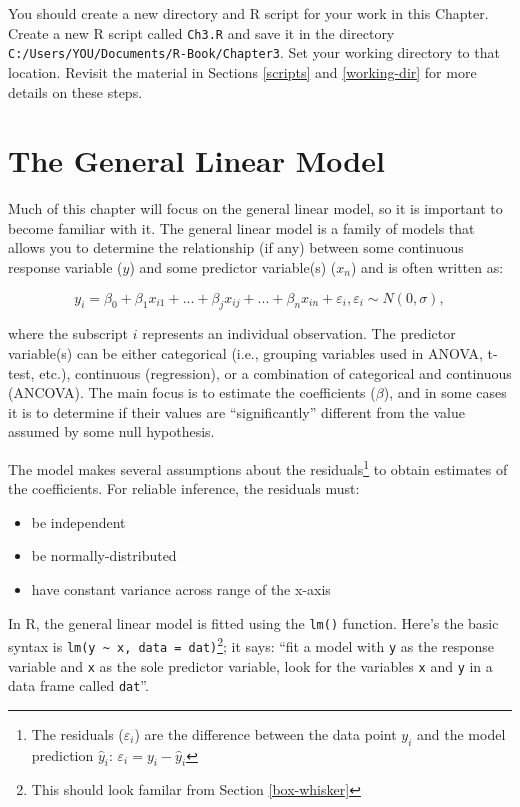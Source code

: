 \documentclass[]{book}
\providecommand{\tightlist}{%
  \setlength{\itemsep}{0pt}\setlength{\parskip}{0pt}}
\let\rmarkdownfootnote\footnote%
\def\footnote{\protect\rmarkdownfootnote}
\theoremstyle{definition}
\theoremstyle{definition}
\theoremstyle{definition}
\theoremstyle{remark}
\begin{document}
You should create a new directory and R script for your work in this
Chapter. Create a new R script called \texttt{Ch3.R} and save it in the
directory \texttt{C:/Users/YOU/Documents/R-Book/Chapter3}. Set your
working directory to that location. Revisit the material in Sections
\ref{scripts} and \ref{working-dir} for more details on these steps.

\section{The General Linear Model}\label{lm}

Much of this chapter will focus on the general linear model, so it is
important to become familiar with it. The general linear model is a
family of models that allows you to determine the relationship (if any)
between some continuous response variable (\(y\)) and some predictor
variable(s) (\(x_n\)) and is often written as:

\begin{equation}
  y_i=\beta_0 + \beta_1 x_{i1} + ... + \beta_j x_{ij}+ ... + \beta_n x_{in} + \varepsilon_i, \varepsilon_i \sim N(0,\sigma),
\label{eq:lin-mod}
\end{equation}

where the subscript \(i\) represents an individual observation. The
predictor variable(s) can be either categorical (i.e., grouping
variables used in ANOVA, t-test, etc.), continuous (regression), or a
combination of categorical and continuous (ANCOVA). The main focus is to
estimate the coefficients (\(\beta\)), and in some cases it is to
determine if their values are ``significantly'' different from the value
assumed by some null hypothesis.

The model makes several assumptions about the residuals\footnote{The
  residuals (\(\varepsilon_i\)) are the difference between the data
  point \(y_i\) and the model prediction \(\hat{y}_i\):
  \(\varepsilon_i=y_i-\hat{y}_i\)} to obtain estimates of the
coefficients. For reliable inference, the residuals must:

\begin{itemize}
\tightlist
\item
  be independent
\item
  be normally-distributed
\item
  have constant variance across range of the x-axis
\end{itemize}

In R, the general linear model is fitted using the \texttt{lm()}
function. Here's the basic syntax is
\texttt{lm(y\ \textasciitilde{}\ x,\ data\ =\ dat)}\footnote{This should
  look familar from Section \ref{box-whisker}}; it says: ``fit a model
with \texttt{y} as the response variable and \texttt{x} as the sole
predictor variable, look for the variables \texttt{x} and \texttt{y} in
a data frame called \texttt{dat}''.
\end{document}
